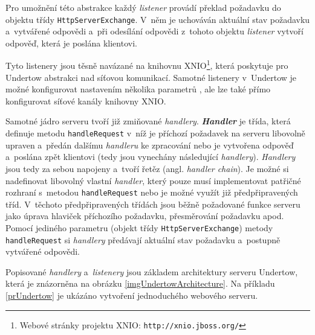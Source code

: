                 Pro umožnění této abstrakce každý \emph{listener} provádí překlad 
                požadavku do objektu třídy
                \texttt{HttpServerExchange}. V~něm je uchováván aktuální stav požadavku a~vytvářené odpovědi
                a~při odesílání odpovědi z~tohoto objektu \emph{listener} vytvoří odpověď, která je poslána klientovi.

                Tyto listenery jsou těsně navázané na knihovnu XNIO\footnote{Webové stránky projektu XNIO: \texttt{http://xnio.jboss.org/}}, která
                poskytuje pro Undertow abstrakci nad síťovou komunikací. Samotné listenery v~Undertow je možné konfigurovat
                nastavením několika parametrů \cite{undertowListeners}, ale lze také přímo konfigurovat síťové kanály knihovny XNIO.

                \medskip
                Samotné jádro serveru tvoří již zmiňované \emph{handlery}.
                \textbf{\emph{Handler}} je třída, která definuje metodu \texttt{handleRequest} v~níž
                je příchozí požadavek na serveru libovolně upraven a~předán dalšímu \emph{handleru} ke zpracování nebo je vytvořena odpověď 
                a~poslána zpět klientovi (tedy jsou vynechány následující \emph{handlery}). 
                \emph{Handlery} jsou tedy za sebou napojeny a~tvoří řetěz (angl. \emph{handler chain}).
                Je možné si nadefinovat libovolný vlastní \emph{handler}, který pouze musí implementovat patřičné rozhraní s~metodou 
                \texttt{handleRequest} nebo je možné využít již předpřipravených tříd. V~těchoto předpřipravených třídách
                jsou běžně požadované funkce serveru jako úprava hlaviček příchozího požadavku, přesměrování požadavku apod.
                Pomocí jediného parametru (objekt třídy \texttt{HttpServerExchange}) metody \texttt{handleRequest} 
                si \emph{handlery} předávají aktuální stav požadavku a~postupně vytvářené odpovědi.


                Popisované \emph{handlery} a~\emph{listenery} jsou základem architektury serveru Undertow, která je znázorněna
                na obrázku \ref{imgUndertowArchitecture}. 
                Na příkladu \ref{prUndertow} je ukázáno vytvoření jednoduchého webového serveru.

